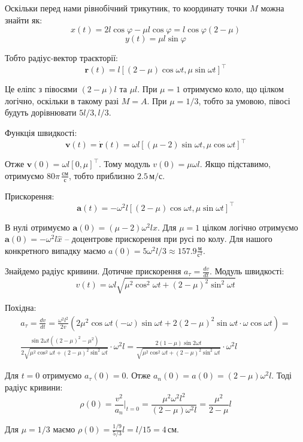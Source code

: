 \documentclass[12pt]{extarticle}
\begin{document}
Оскільки перед нами рівнобічний трикутник, то координату точки $M$ можна знайти як:
\[
x(t) = 2l \cos\varphi - \mu l \cos\varphi = l\cos\varphi(2 - \mu)
\]
\[
y(t) = \mu l \sin \varphi
\]

Тобто радіус-вектор траєкторії:
\[
\boldsymbol{r}(t) = l[(2-\mu)\cos \omega t, \mu \sin \omega t]^{\top}
\]

Це еліпс з півосями $(2-\mu)l$ та $\mu l$. При $\mu=1$ отримуємо коло, що цілком логічно, оскільки в такому разі $M=A$. При $\mu=1/3$, тобто за умовою, півосі будуть дорівнювати $5l/3, l/3$. 

Функція швидкості:
\[
\boldsymbol{v}(t) = \dot{\boldsymbol{r}}(t) = \omega l[(\mu-2)\sin \omega t,\mu \cos \omega t]^{\top}
\]

Отже $\boldsymbol{v}(0) = \omega l [0, \mu]^{\top}$. Тому модуль $v(0) = \mu \omega l$. Якщо підставимо, отримуємо $80\pi \, \frac{\text{см}}{\text{с}}$, тобто приблизно $2.5 \, \text{м}/\text{с}$. 

Прискорення:
\[
\boldsymbol{a}(t) = -\omega^2 l [(2-\mu)\cos \omega t, \mu \sin \omega t]^{\top}
\]

В нулі отримуємо $\boldsymbol{a}(0) = (\mu - 2)\omega^2 l \hat{x}$. Для $\mu=1$ цілком логічно отримуємо $\boldsymbol{a}(0)=-\omega^2 l \hat{x}$ -- доцентрове прискорення при русі по колу. Для нашого конкретного випадку маємо $a(0)=5\omega^2 l/3 \approx 157.9 \frac{\text{м}}{\text{с}^2}$. 

Знайдемо радіус кривини. Дотичне прискорення $a_{\tau} = \frac{dv}{dt}$. Модуль швидкості:
\[
v(t) = \omega l \sqrt{\mu^2 \cos^2 \omega t + (2-\mu)^2 \sin^2 \omega t}
\]

Похідна:
\begin{align*}
a_{\tau} = \frac{dv}{dt} = \frac{\omega^2 l^2}{2v} \left(2\mu^2 \cos \omega t (-\omega) \sin \omega t + 2(2-\mu)^2 \sin \omega t\cdot \omega \cos \omega t \right) = \\
\frac{\sin 2\omega t ((2-\mu)^2-\mu^2)}{2 \sqrt{\mu^2 \cos^2 \omega t + (2-\mu)^2 \sin^2 \omega t}} \cdot \omega^2 l = \frac{2(1-\mu)\sin2\omega t}{\sqrt{\mu^2 \cos^2 \omega t + (2-\mu)^2 \sin^2 \omega t}} \cdot \omega^2 l
\end{align*}

Для $t=0$ отримуємо $a_{\tau}(0) = 0$. Отже $a_n(0) = a(0) = (2-\mu)\omega^2 l$. Тоді радіус кривини:
\[
\rho(0) = \frac{v^2}{a_n}\Big|_{t=0} = \frac{\mu^2\omega^2l^2}{(2-\mu)\omega^2 l} = \frac{\mu^2}{2-\mu} l
\]

Для $\mu=1/3$ маємо $\rho(0) = \frac{1/9}{5/3}l = l/15 = 4 \, \text{см}$. 
\end{document}
